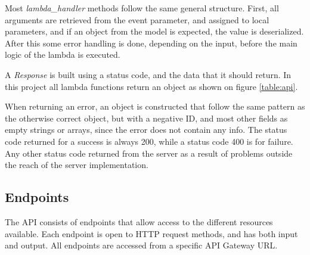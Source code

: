 Most \textit{lambda\_handler} methods follow the same general structure. First, all arguments are retrieved from the event parameter, and assigned to local parameters, and if an object from the model is expected, the value is deserialized. After this some error handling is done, depending on the input, before the main logic of the lambda is executed.

A \textit{Response} is built using a status code, and the data that it should return. In this project all lambda functions return an object as shown on figure \ref{table:api}.

When returning an error, an object is constructed that follow the same pattern as the otherwise correct object, but with a negative ID, and most other fields as empty strings or arrays, since the error does not contain any info.
The status code returned for a success is always 200, while a status code 400 is for failure. Any other status code returned from the server as a result of problems outside the reach of the server implementation.

\subsection{Endpoints}
The API consists of endpoints that allow access to the different resources available. Each endpoint is open to HTTP request methods, and has both input and output. All endpoints are accessed from a specific API Gateway URL.

